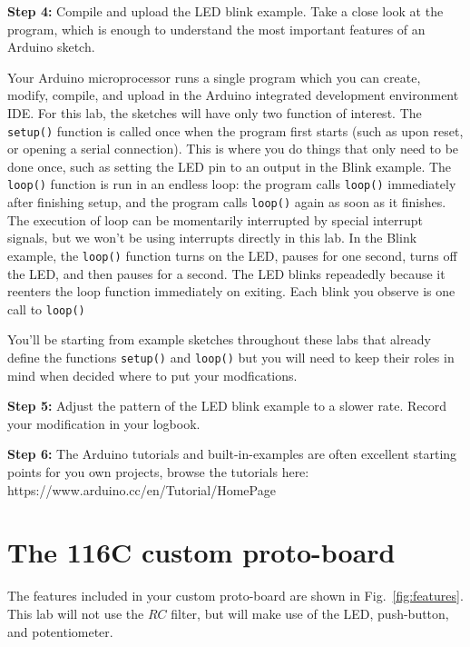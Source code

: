 \documentclass[12pt]{article}
\begin{document}
\vspace{0.5 cm}
\noindent
{\bf Step 4:} Compile and upload the LED blink example.  Take a close
look at the program, which is enough to understand the most important features of an Arduino sketch.

\vspace{0.5 cm}
Your Arduino microprocessor runs a single program which you can
create, modify, compile, and upload in the Arduino integrated
development environment IDE.  For this lab, the sketches will have
only two function of interest.  The {\tt setup()} function is called
once when the program first starts (such as upon reset, or opening a
serial connection).  This is where you do things that only need to be
done once, such as setting the LED pin to an output in the Blink
example.  The {\tt loop()} function is run in an endless loop: the
program calls {\tt loop()} immediately after finishing setup, and the
program calls {\tt loop()} again as soon as it finishes.  The
execution of loop can be momentarily interrupted by special interrupt
signals, but we won't be using interrupts directly in this lab.  In
the Blink example, the {\tt loop()} function turns on the LED, pauses
for one second, turns off the LED, and then pauses for a second.  The
LED blinks repeadedly because it reenters the loop function
immediately on exiting.  Each blink you observe is one call to
{\tt loop()}

You'll be starting from example sketches throughout these labs that
already define the functions {\tt setup()} and {\tt loop()} but you
will need to keep their roles in mind when decided where to put your
modfications.

\vspace{0.5 cm}
\noindent
{\bf Step 5:} Adjust the pattern of the LED blink example to a slower rate.  Record your modification in your logbook.

\vspace{0.5 cm}
\noindent
{\bf Step 6:}  The Arduino tutorials and built-in-examples are often excellent starting points for you own projects, browse the tutorials here:\\
https://www.arduino.cc/en/Tutorial/HomePage

\section{The 116C custom proto-board}

The features included in your custom proto-board are shown in
Fig.~\ref{fig:features}.  This lab will not use the $RC$ filter, but
will make use of the LED, push-button, and potentiometer. 
\end{document}
